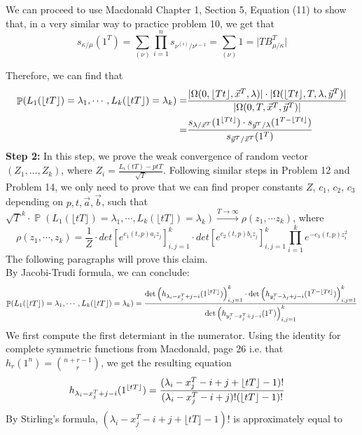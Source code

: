 \documentclass[12pt]{article}
\DeclareMathOperator{\pr}{\mathbb{P}}
\DeclarePairedDelimiter\floor{\lfloor}{\rfloor}
\begin{document}
We can proceed to use Macdonald Chapter 1, Section 5, Equation (11) to show that, in a very similar way to practice problem 10, we get that 
\[s_{\kappa/\mu}(1^T)=\sum_{(\nu)}\prod_{i=1}^n s_{\nu^{(i)}/\nu^{i-1}}=\sum_{(\nu)} 1=\lvert TB_{\mu/\kappa}^T\rvert\]

Therefore, we can find that 
\begin{align*}
\pr(L_1(\lfloor tT\rfloor)=\lambda_1,\cdots, L_k(\lfloor tT\rfloor)=\lambda_k)
=&{}\frac{\lvert \Omega(0,\lfloor Tt\rfloor, \vec{x}^T, \lambda)\rvert\cdot \lvert \Omega(\lfloor Tt\rfloor ,T, \lambda, \vec{y}^T)\rvert}{\lvert \Omega(0, T, \vec{x}^T, \vec{y}^T)\rvert}\\
=&{}\frac{s_{\lambda/\vec{x}^T}(1^{\floor{Tt}})\cdot s_{\vec{y}^T/\lambda}(1^{T-\floor{Tt}})}{s_{\vec{y}^T/\vec{x}^T}(1^T)}
\end{align*}
\textbf{Step 2:} In this step, we prove the weak convergence of random vector $(Z_{1},\dots,Z_{k})$, where $Z_{i}=\frac{L_{i}(tT)-ptT}{\sqrt{T}}$. Following similar steps in Problem 12 and Problem 14, we only need to prove that we can find proper constants $Z$, $c_{1}$, $c_{2}$, $c_{3}$ depending on $p,t,\vec{a},\vec{b}$, such that $\sqrt{T}^{k}\cdot \pr(L_1(\lfloor tT\rfloor)=\lambda_1,\cdots, L_k(\lfloor tT\rfloor)=\lambda_k)\xrightarrow{T\rightarrow \infty} \rho(z_{1},\cdots z_{k})$, where $$\rho(z_{1},\cdots,z_{k})=\frac{1}{Z}\cdot det[e^{c_1(t,p)a_{i}z_{j}}]_{i,j=1}^{k}\cdot det[e^{c_2(t,p)b_{i}z_{j}}]_{i,j=1}^{k}\prod_{i=1}^{k}e^{-c_{3}(t,p)z_{i}^{2}}$$ The following paragraphs will prove this claim.\\
By Jacobi-Trudi formula, we can conclude:
\begin{align*}
\pr(L_1(\lfloor tT\rfloor)=\lambda_1,\cdots, L_k(\lfloor tT\rfloor)=\lambda_k)=\frac{\det\left(h_{\lambda_i-x_j^T+j-i}(1^{\floor{tT}})\right)_{i,j=1}^k\cdot\det\left(h_{y_i^T-\lambda_j+j-i}(1^{T-\floor{Tt}})\right)_{i,j=1}^k}{\det\left(h_{y_i^{T}-x_j^T+j-i}(1^T)\right)_{i,j=1}^k}	
\end{align*}
We first compute the first determiant in the numerator. Using the identity for complete symmetric functions from Macdonald, page 26 i.e. that $h_r(1^n)=\binom{n+r-1}{r}$, we get the resulting equation 
\begin{align*}
h_{\lambda_i-x_j^T+j-i}(1^{\floor{tT}})&=\frac{(\lambda_{i}-x_{j}^{T}-i+j+\lfloor tT \rfloor -1)!}{(\lambda_{i}-x_{j}^{T}-i+j)!(\lfloor tT \rfloor -1)!}
\end{align*}
By Stirling's formula, $(\lambda_{i}-x_{j}^{T}-i+j+\lfloor tT \rfloor -1)!$ is approximately equal to
\end{document}
